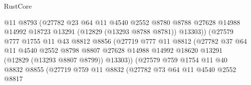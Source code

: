 \begin{lexlean}{RustCore}
\begin{coremodule}
                                  @11
                                  @8793
                                  (@27782
                                    @23
                                    @64
                                    @11
                                    @4540
                                    @2552
                                    @8780
                                    @8788
                                    @27628
                                    @14988
                                    @14992
                                    @18723
                                    @13291
                                    (@12829 (@13293 @8788 @8781))
                                    @13303))
                                (@27579
                                  @777
                                  @1755
                                  @11
                                  @43
                                  @8812
                                  @8856
                                  (@27719
                                    @777
                                    @11
                                    @8812
                                    (@27782
                                      @37
                                      @64
                                      @11
                                      @4540
                                      @2552
                                      @8798
                                      @8807
                                      @27628
                                      @14988
                                      @14992
                                      @18620
                                      @13291
                                      (@12829 (@13293 @8807 @8799))
                                      @13303))
                                  (@27579
                                    @759
                                    @1754
                                    @11
                                    @40
                                    @8832
                                    @8855
                                    (@27719
                                      @759
                                      @11
                                      @8832
                                      (@27782
                                        @73
                                        @64
                                        @11
                                        @4540
                                        @2552
                                        @8817

\end{coremodule}
\end{lexlean}
